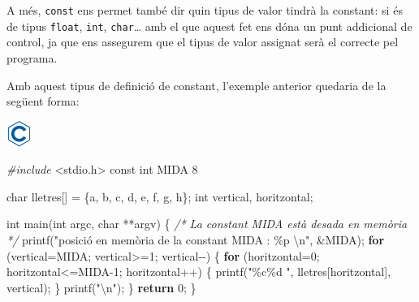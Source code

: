 \documentclass[
]{book}
\newenvironment{Shaded}{\begin{snugshade}}{\end{snugshade}}
\newcommand{\CharTok}[1]{\textcolor[rgb]{0.31,0.60,0.02}{#1}}
\newcommand{\CommentTok}[1]{\textcolor[rgb]{0.56,0.35,0.01}{\textit{#1}}}
\newcommand{\ControlFlowTok}[1]{\textcolor[rgb]{0.13,0.29,0.53}{\textbf{#1}}}
\newcommand{\DataTypeTok}[1]{\textcolor[rgb]{0.13,0.29,0.53}{#1}}
\newcommand{\DecValTok}[1]{\textcolor[rgb]{0.00,0.00,0.81}{#1}}
\newcommand{\ImportTok}[1]{#1}
\newcommand{\NormalTok}[1]{#1}
\newcommand{\PreprocessorTok}[1]{\textcolor[rgb]{0.56,0.35,0.01}{\textit{#1}}}
\newcommand{\SpecialCharTok}[1]{\textcolor[rgb]{0.00,0.00,0.00}{#1}}
\newcommand{\StringTok}[1]{\textcolor[rgb]{0.31,0.60,0.02}{#1}}
\begin{document}
A més, \texttt{const} ens permet també dir quin tipus de valor tindrà la constant: si és de tipus \texttt{float}, \texttt{int}, \texttt{char}\ldots{} amb el que aquest fet ens dóna un punt addicional de control, ja que ens assegurem que el tipus de valor assignat serà el correcte pel programa.

Amb aquest tipus de definició de constant, l'exemple anterior quedaria de la següent forma:

\includegraphics{./img/c.png}

\begin{Shaded}
\begin{Highlighting}[]
\PreprocessorTok{\#include }\ImportTok{\textless{}stdio.h\textgreater{}}
\DataTypeTok{const} \DataTypeTok{int}\NormalTok{ MIDA }\DecValTok{8}

\DataTypeTok{char}\NormalTok{ lletres[] = \{}\CharTok{\textquotesingle{}a\textquotesingle{}}\NormalTok{, }\CharTok{\textquotesingle{}b\textquotesingle{}}\NormalTok{, }\CharTok{\textquotesingle{}c\textquotesingle{}}\NormalTok{, }\CharTok{\textquotesingle{}d\textquotesingle{}}\NormalTok{, }\CharTok{\textquotesingle{}e\textquotesingle{}}\NormalTok{, }\CharTok{\textquotesingle{}f\textquotesingle{}}\NormalTok{, }\CharTok{\textquotesingle{}g\textquotesingle{}}\NormalTok{, }\CharTok{\textquotesingle{}h\textquotesingle{}}\NormalTok{\};}
\DataTypeTok{int}\NormalTok{ vertical, horitzontal;}

\DataTypeTok{int}\NormalTok{ main(}\DataTypeTok{int}\NormalTok{ argc, }\DataTypeTok{char}\NormalTok{ **argv) \{}
    \CommentTok{/* La constant MIDA està desada en memòria */}
\NormalTok{    printf(}\StringTok{"posició en memòria de la constant MIDA : \%p }\SpecialCharTok{\textbackslash{}n}\StringTok{"}\NormalTok{, \&MIDA);}
    \ControlFlowTok{for}\NormalTok{ (vertical=MIDA; vertical\textgreater{}=}\DecValTok{1}\NormalTok{; vertical{-}{-}) \{}
        \ControlFlowTok{for}\NormalTok{ (horitzontal=}\DecValTok{0}\NormalTok{; horitzontal\textless{}=MIDA{-}}\DecValTok{1}\NormalTok{; horitzontal++) \{}
\NormalTok{            printf(}\StringTok{"\%c\%d "}\NormalTok{, lletres[horitzontal], vertical);}
\NormalTok{        \}}
\NormalTok{        printf(}\StringTok{"}\SpecialCharTok{\textbackslash{}n}\StringTok{"}\NormalTok{);}
\NormalTok{    \}}
    \ControlFlowTok{return} \DecValTok{0}\NormalTok{;}
\NormalTok{\}}
\end{Highlighting}
\end{Shaded}
\end{document}
